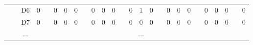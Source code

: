 \documentclass[12pt]{article}
\begin{document}
\begin{table}[!ht]
{\begin{tabular}{clcccccccccccccccccccccccc}
									& \multicolumn{1}{l|}{} & \multicolumn{1}{c|}{D6}   & \multicolumn{1}{c|}{0}    & \multicolumn{1}{c|}{}                     & \multicolumn{1}{c|}{0}    & \multicolumn{1}{c|}{0}    & \multicolumn{1}{c|}{0}  & \multicolumn{1}{c|}{}                     & \multicolumn{1}{c|}{0}  & \multicolumn{1}{c|}{0}  & \multicolumn{1}{c|}{0}  & \multicolumn{1}{c|}{}                     & \multicolumn{1}{c|}{0}    & \multicolumn{1}{c|}{1}    & \multicolumn{1}{c|}{0}    & \multicolumn{1}{c|}{}                     & \multicolumn{1}{c|}{0}  & \multicolumn{1}{c|}{0}  & \multicolumn{1}{c|}{0}    & \multicolumn{1}{c|}{}                     & \multicolumn{1}{c|}{0}    & \multicolumn{1}{c|}{0}    & \multicolumn{1}{c|}{0}  & \multicolumn{1}{c|}{}                     & \multicolumn{1}{c|}{0}  \\ \cline{3-4} \cline{6-8} \cline{10-12} \cline{14-16} \cline{18-20} \cline{22-24} \cline{26-26} 
									& \multicolumn{1}{l|}{} & \multicolumn{1}{c|}{D7}   & \multicolumn{1}{c|}{0}    & \multicolumn{1}{c|}{}                     & \multicolumn{1}{c|}{0}    & \multicolumn{1}{c|}{0}    & \multicolumn{1}{c|}{0}  & \multicolumn{1}{c|}{}                     & \multicolumn{1}{c|}{0}  & \multicolumn{1}{c|}{0}  & \multicolumn{1}{c|}{0}  & \multicolumn{1}{c|}{}                     & \multicolumn{1}{c|}{0}    & \multicolumn{1}{c|}{0}    & \multicolumn{1}{c|}{0}    & \multicolumn{1}{c|}{}                     & \multicolumn{1}{c|}{0}  & \multicolumn{1}{c|}{0}  & \multicolumn{1}{c|}{0}    & \multicolumn{1}{c|}{}                     & \multicolumn{1}{c|}{0}    & \multicolumn{1}{c|}{0}    & \multicolumn{1}{c|}{0}  & \multicolumn{1}{c|}{}                     & \multicolumn{1}{c|}{0}  \\ \cline{3-4} \cline{6-8} \cline{10-12} \cline{14-16} \cline{18-20} \cline{22-24} \cline{26-26} 
									& \multicolumn{1}{l|}{} & \multicolumn{1}{c|}{...}  & \multicolumn{23}{c|}{...}                                                                                                                                                                                                                                                                                                                                                                                                                                                                                                                                                                                                                                                                                                                         \\ \cline{3-4} \cline{6-8} \cline{10-12} \cline{14-16} \cline{18-20} \cline{22-24} \cline{26-26} 

\end{tabular}}
\end{table}
\end{document}
